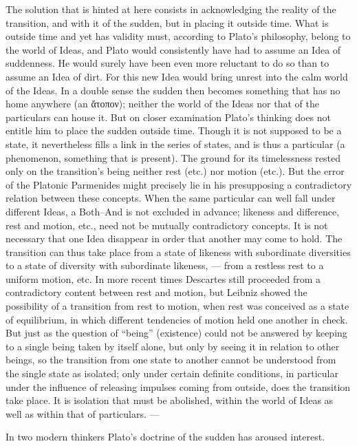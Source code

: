 \documentclass[12pt,a4paper,openany]{book}
\newcommand{\opage}[1]{\marginnote{\footnotesize\textit{[#1]}}}
\begin{document}
The solution that is hinted at here consists in acknowledging
the reality of the transition, and with it of the sudden, but in
placing it outside time.  What is outside time and
yet has validity must, according to Plato's philosophy, belong
to the world of Ideas, and Plato would consistently have had to assume
an Idea of suddenness.  He would surely have been even more reluctant to do so
than to assume an Idea of dirt.  For this
new Idea would bring unrest into the calm world of the Ideas.  In
a double sense the sudden then becomes something that has
no home anywhere (an ἄτοπον); neither the world of the Ideas nor that of the particulars
can house it.  But on closer examination
Plato's thinking does not entitle him to place the
sudden outside time.  Though it is not supposed
to be a state, it nevertheless fills a link in the series of states, and is
thus a particular (a phenomenon, something that is present).  The ground
for its timelessness rested only on the transition's being
neither rest (etc.) nor motion
(etc.).  But the error of the Platonic Parmenides might
precisely lie in his presupposing a contradictory relation
between these concepts.  When the same particular can well
fall under different Ideas, a Both--And is not
\setcounter{footnote}{0}%
\opage{40}excluded in advance; likeness and difference, rest and motion,
etc., need not be mutually contradictory
concepts.  It is not necessary that one Idea disappear
in order that another may come to hold.  The transition can
thus take place from a state of likeness with subordinate
diversities to a state of diversity with subordinate
likeness, --- from a restless rest to a uniform motion,
etc.  In more recent times Descartes still proceeded from a
contradictory content between rest and motion, but
Leibniz showed the possibility of a transition from rest to motion,
when rest was conceived as a state of equilibrium,
in which different tendencies of motion held one another
in check.  But just as the question of ``being'' (existence)
could not be answered by keeping to a single being
taken by itself alone, but only by seeing it in relation to other
beings, so the transition from one state to
another cannot be understood from the single state as isolated;
only under certain definite conditions, in particular under the
influence of releasing impulses coming from outside, does
the transition take place.  It is isolation that must be abolished,
within the world of Ideas as well as within that of particulars. ---

In two modern thinkers Plato's doctrine of the
sudden has aroused interest.
\end{document}

